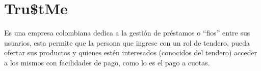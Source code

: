 \section{Tru\$tMe}

{Es una empresa colombiana dedica a la gestión de préstamos o “fios” entre sus usuarios, esta permite que la persona que ingrese con un rol de tendero, pueda ofertar sus productos y quienes estén interesados (conocidos del tendero) acceder a los mismos con facilidades de pago, como lo es el pago a cuotas.}
